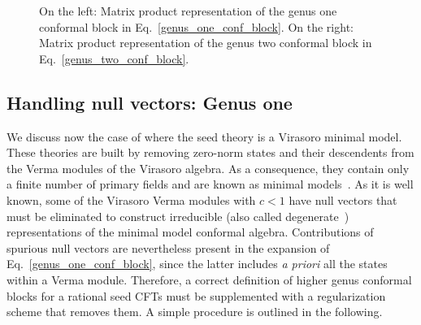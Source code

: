 \documentclass[a4paper,11pt]{article}
\begin{document}
\begin{figure}[t]
\centering
\caption{On the left: Matrix product representation of the genus one conformal block in Eq.~\eqref{genus_one_conf_block}. On the right: Matrix product representation of the genus two conformal block in Eq.~\eqref{genus_two_conf_block}.}
\label{fig-g1}
\end{figure}

\subsection{Handling null vectors: Genus one}
We discuss now the case of where the seed theory is a Virasoro minimal model. These theories are built by removing zero-norm states and their descendents from the Verma modules of the Virasoro algebra.  As a consequence, they contain only a finite number of primary fields and are known as minimal models~\cite{BPZ}. 
As it is well known, some of the Virasoro Verma modules with $c<1$  have 
null vectors  that must be eliminated to construct irreducible (also called degenerate~\cite{Ribault}) representations of the minimal model conformal algebra.
Contributions of spurious null vectors 
are nevertheless present in the expansion of Eq.~\eqref{genus_one_conf_block}, since the latter includes \textit{a priori} all the states within a Verma module. Therefore, a correct definition of higher genus conformal blocks for a rational seed CFTs  must be supplemented with a regularization scheme that removes them. A simple procedure is outlined in the following. 
\end{document}
